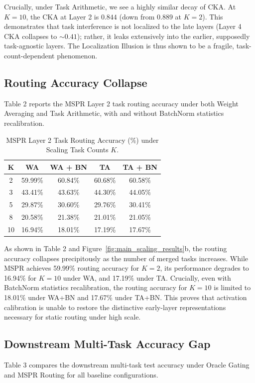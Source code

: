 \documentclass{article}
\theoremstyle{plain}
\theoremstyle{definition}
\theoremstyle{remark}
\begin{document}
Crucially, under Task Arithmetic, we see a highly similar decay of CKA. At $K=10$, the CKA at Layer 2 is $0.844$ (down from $0.889$ at $K=2$). This demonstrates that task interference is not localized to the late layers (Layer 4 CKA collapses to $\sim 0.41$); rather, it leaks extensively into the earlier, supposedly task-agnostic layers. The Localization Illusion is thus shown to be a fragile, task-count-dependent phenomenon.

\subsection{Routing Accuracy Collapse}
Table 2 reports the MSPR Layer 2 task routing accuracy under both Weight Averaging and Task Arithmetic, with and without BatchNorm statistics recalibration.

\begin{table}[ht]
\centering
\caption{MSPR Layer 2 Task Routing Accuracy (\%) under Scaling Task Counts $K$.}
\vskip 0.1in
\begin{tabular}{ccccc}
\toprule
\textbf{K} & \textbf{WA} & \textbf{WA + BN} & \textbf{TA} & \textbf{TA + BN} \\
\midrule
2 & 59.99\% & 60.84\% & 60.68\% & 60.58\% \\
3 & 43.41\% & 43.63\% & 44.30\% & 44.05\% \\
5 & 29.87\% & 30.60\% & 29.76\% & 30.41\% \\
8 & 20.58\% & 21.38\% & 21.01\% & 21.05\% \\
10 & 16.94\% & 18.01\% & 17.19\% & 17.67\% \\
\bottomrule
\end{tabular}
\end{table}

As shown in Table 2 and Figure~\ref{fig:main_scaling_results}b, the routing accuracy collapses precipitously as the number of merged tasks increases. While MSPR achieves 59.99\% routing accuracy for $K=2$, its performance degrades to 16.94\% for $K=10$ under WA, and 17.19\% under TA. Crucially, even with BatchNorm statistics recalibration, the routing accuracy for $K=10$ is limited to 18.01\% under WA+BN and 17.67\% under TA+BN. This proves that activation calibration is unable to restore the distinctive early-layer representations necessary for static routing under high scale.

\subsection{Downstream Multi-Task Accuracy Gap}
Table 3 compares the downstream multi-task test accuracy under Oracle Gating and MSPR Routing for all baseline configurations.
\end{document}
